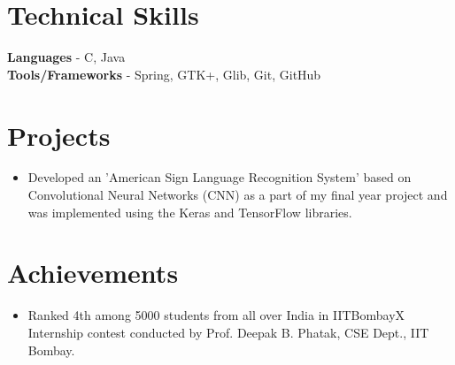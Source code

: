 \documentclass[12pt,margin, centered]{res}
\begin{document}
\begin{resume}
\section{Technical \hspace{2mm} Skills}
\vspace{10mm}
\textbf{Languages} - C, Java \\
\textbf{Tools/Frameworks} - Spring, GTK+, Glib, Git, GitHub

\section{Projects}
\vspace{10mm}
\begin{itemize}[leftmargin=*]
 \item Developed an 'American Sign Language Recognition System' based on Convolutional Neural Networks (CNN) as a part of my final year project and was implemented using the Keras and TensorFlow libraries.
\end{itemize}


\section{Achievements}
\vspace{12mm}
\begin{itemize}[leftmargin=*]
\item Ranked 4th among 5000 students from all over India in IITBombayX Internship contest conducted by Prof. Deepak B. Phatak, CSE Dept., IIT Bombay.
\end{itemize}


\end{resume}
\end{document}
